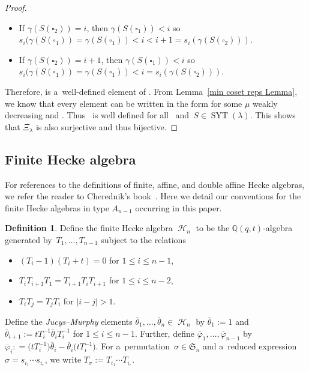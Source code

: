 \documentclass[10pt,a4paper]{amsart}
\numberwithin{equation}{section}
\theoremstyle{definition}
\newtheorem{Definition}[Theorem]{Definition}
\DeclareMathOperator{\SYT}{\mathrm{SYT}}
\DeclareMathOperator{\PSYT}{\mathrm{PSYT}_{\geq 0}}
\DeclareMathOperator{\sH}{\mathscr{H}}
\begin{document}
\begin{proof}
\begin{itemize}
 \item If $\gamma(S(\square_2)) = i$, then $\gamma(S(\square_1))< i$ so $s_i(\gamma(S(\square_1)) = \gamma(S(\square_1)) < i < i+1 = s_i(\gamma(S(\square_2)))$.
 \item If $\gamma(S(\square_2)) = i+1$,
 then $\gamma(S(\square_1)) < i$ so $s_i(\gamma(S(\square_1)) = \gamma(S(\square_1)) < i = s_i(\gamma(S(\square_2)))$.
 \end{itemize}
 Therefore,  is a~well-defined element of \smash{$\PSYT(\lambda)$}. From Lemma~\ref{min coset reps Lemma}, we know that every element  can be written in the form  for some $\mu$ weakly decreasing and . Thus~\smash{$\sigma(S) \in \PSYT(\lambda)$} is well defined for all~ and~${S \in \SYT(\lambda)}$.
 This shows that $\Xi_{\lambda}$ is also surjective and thus bijective.
\end{proof}

\subsection{Finite Hecke algebra}
For references to the definitions of finite, affine, and double affine Hecke algebras, we refer the reader to Cherednik's book~\cite{CherednikBook}. Here we detail our conventions for the finite Hecke algebras in type $A_{n-1}$ occurring in this paper.

\begin{Definition}\label{finite hecke alg Definition}
 Define the finite Hecke algebra $\sH_n$ to be the $\mathbb{Q}(q,t)$-algebra generated by~${T_1,\dots, T_{n-1}}$ subject to the relations
 \begin{itemize}\itemsep=0pt
 \item $(T_i-1)(T_i+t) = 0$ for $1\leq i \leq n-1$,
 \item $T_iT_{i+1}T_1 = T_{i+1}T_iT_{i+1}$ for $1\leq i \leq n-2$,
 \item $T_iT_j = T_jT_i$ for $|i-j| > 1$.
 \end{itemize}
 Define the \textit{Jucys--Murphy} elements $\overline{\theta}_1,\dots, \overline{\theta}_n \in \sH_n$ by $\overline{\theta}_1 := 1$ and $\overline{\theta}_{i+1}:= tT_{i}^{-1}\overline{\theta}_{i}T_{i}^{-1}$ for $1\leq i \leq n-1$. Further, define $\overline{\varphi}_1,\dots, \overline{\varphi}_{n-1}$ by $\overline{\varphi}_i: = \bigl(tT_{i}^{-1}\bigr)\overline{\theta}_i - \overline{\theta}_{i}\bigl(tT_i^{-1}\bigr)$. For a~permutation~${\sigma \in \mathfrak{S}_n}$ and a~reduced expression $\sigma = s_{i_1}\cdots s_{i_r}$, we write $T_{\sigma} := T_{i_1}\cdots T_{i_r}$.
\end{Definition}
\end{document}
